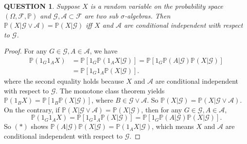 \documentclass[12pt]{article}
\renewcommand{\(}{\left(}%
\renewcommand{\)}{\right)}%
\renewcommand{\[}{\left[}%
\renewcommand{\]}{\right]}%
\renewcommand{\a}{\mathscr{A}}
\newcommand{\p}{\mathbb{P}}
\newcommand{\f}{\mathscr{F}}
\newcommand{\g}{\mathscr{G}}
\newtheorem{question}{QUESTION}[section]}
\newtheorem{proof}{Proof.}}
\begin{document}
  \begin{question}
  	Suppose $X$ is a random variable on the probability space $(\Omega,\f,\p)$ and $\g,\a\subset\f$ are two sub $\sigma$-algebras. Then $\p(X|\g\vee \a)=\p(X|\g)$ iff $X$ and $\a$ are conditional independent with respect to $\g$.
  \end{question}
  \begin{proof}
  	For any $G\in\g,A\in\a$, we have
  	\begin{equation*}
  		\begin{split}
  			\p(1_G1_AX)&=\p[1_G\p(1_AX|\g)]=\p[1_G\p(A|\g)\p(X|\g)]\\
  			&=\p[1_G1_A\p(X|\g)].
  		\end{split}
  	\end{equation*}
  	where the second equality holds because $X$ and $\a$ are conditional independent with respect to $\g$. The monotone class theorem yields $\p(1_BX)=\p[1_B\p(X|\g)]$, where $B\in \g\vee\a$. So $\p(X|\g)=\p(X|\g\vee\a)$. On the contrary, if $\p(X|\g\vee \a)=\p(X|\g)$, then for any $G\in\g,A\in\a$,
  	\begin{equation}
  		\p(1_G1_AX)=\p[1_G1_A\p(X|\g)]=\p[1_G\p(A|\g)\p(X|\g)]. \tag{$*$}
  	\end{equation}
  	So $(*)$ shows $\p(A|\g)\p(X|\g)=\p(1_AX|\g)$, which means $X$ and $\a$ are conditional independent with respect to $\g$.
  \end{proof}
  
\end{document}
